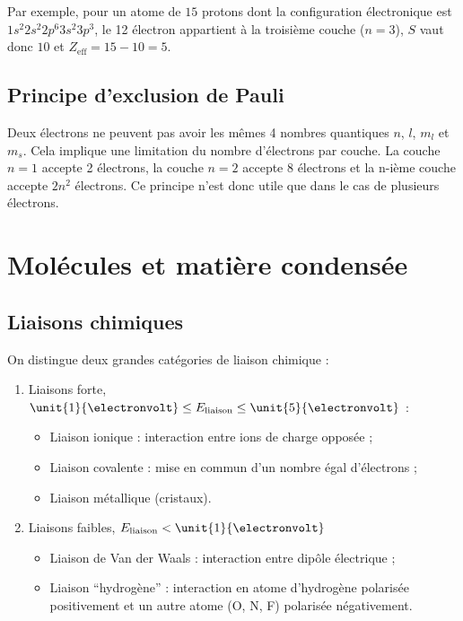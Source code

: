 Par exemple, pour un atome de $15$ protons dont la configuration 
électronique est $1s^2 2s^2 2p^6 3s^2 3p^3$, le 12\ieme{} électron
appartient à la troisième couche ($n=3$), $S$ vaut donc $10$ et 
$Z_\mathrm{eff} = 15 - 10 = 5$.

\subsection{Principe d'exclusion de Pauli}
Deux électrons ne peuvent pas avoir les mêmes 4 nombres quantiques
$n$, $l$, $m_l$ et $m_s$. Cela implique une limitation du nombre
d'électrons par couche. La couche $n=1$ accepte 2 électrons,
la couche $n=2$ accepte 8 électrons et la n-ième couche
accepte $2n^2$ électrons.
Ce principe n'est donc utile que dans le cas de plusieurs électrons.


\section{Molécules et matière condensée}
\subsection{Liaisons chimiques}
On distingue deux grandes catégories de
liaison chimique :
\begin{enumerate}
	\item Liaisons forte, $\unit{1}{\electronvolt} \leq E_{\text{liaison}} \leq \unit{5}{\electronvolt}$ :
	\begin{itemize}
		\item Liaison ionique : interaction entre ions de charge opposée ;
		\item Liaison covalente : mise en commun d'un nombre égal d'électrons ;
		\item Liaison métallique (cristaux).
	\end{itemize}
	\item Liaisons faibles, $E_{\text{liaison}} < \unit{1}{\electronvolt}$
	\begin{itemize}
		\item Liaison de Van der Waals : interaction entre dipôle électrique ;
		\item Liaison ``hydrogène'' : interaction en atome d'hydrogène polarisée
		positivement et un autre atome (O, N, F) polarisée négativement.
	\end{itemize}
\end{enumerate}

